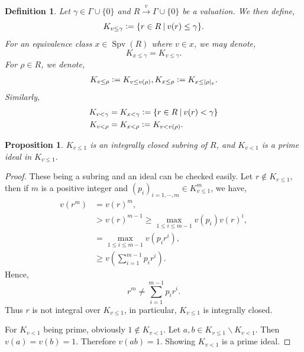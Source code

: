 \documentclass[8pt]{article}
\numberwithin{equation}{section}
\newtheorem{proposition}{Proposition}[subsection]
\newtheorem{definition}{Definition}[subsection]
\DeclareMathOperator{\Spv}{Spv}
\newcommand{\defeq}{\vcentcolon=}
\newcommand{\sep}[0]{\:|\:}
\newcommand{\ab}[1]{\vert #1 \vert}
\begin{document}
\begin{definition}
    \label{definition_6_7}
    Let $\gamma\in\Gamma\cup\{0\}$ and $R\stackrel{v}{\to}\Gamma\cup\{0\}$ be a valuation. We then define,
    \begin{equation*}
    K_{v\leq \gamma}\defeq \{r\in R\sep v(r)\leq \gamma\}.
    \end{equation*}
    For an equivalence class $x\in\Spv(R)$ where $v\in x$, we may denote,
    \begin{equation*}
        K_{x\leq\gamma} = K_{v\leq\gamma}.
    \end{equation*}
    For $\rho\in R$, we denote,
    \begin{align*}
        K_{v\leq\rho} \defeq K_{v\leq v(\rho)}, K_{x\leq \rho} \defeq K_{x\leq\ab{\rho}_x}.
    \end{align*}
    Similarly,
    \begin{align*}
        K_{v<\gamma} &= K_{x<\gamma} \defeq\{r\in R\sep v(r)<\gamma\}\\
        K_{v<\rho} & = K_{x<\rho} \defeq K_{v<v(\rho)}.
    \end{align*}
\end{definition}

\begin{proposition}
    \label{fact_6_5}
    $K_{v\leq 1}$ is an integrally closed subring of $R$, and $K_{v<1}$ is a prime ideal in $K_{v\leq 1}$.
\end{proposition}
\begin{proof}
    These being a subring and an ideal can be checked easily. Let $r\not\in K_{r\leq 1}$, then if $m$ is a positive integer and $(p_i)_{i=1,\cdots,m}\in K_{v\leq 1}^m$, we have,
    \begin{align*}
    v(r^m) &= v(r)^m,\\
    &> v(r)^{m-1}\geq\max_{1\leq i\leq m-1}v(p_i)v(r)^i,\\
    & = \max_{1\leq i\leq m-1}v(p_ir^i),\\
    & \geq v\left(\sum_{i=1}^{m-1}p_ir^i\right).
    \end{align*}
    Hence,
    \begin{equation*}
        r^m \not = \sum_{i=1}^{m-1}p_ir^i.
    \end{equation*}
    Thus $r$ is not integral over $K_{v\leq 1}$, in particular, $K_{v\leq 1}$ is integrally closed.
    \par For $K_{v<1}$ being prime, obviously $1\not\in K_{v<1}$. Let $a,b\in K_{v\leq 1}\backslash K_{v<1}$. Then $v(a) = v(b) = 1$. Therefore $v(ab) = 1$. Showing $K_{v<1}$ is a prime ideal.
\end{proof}
\end{document}

